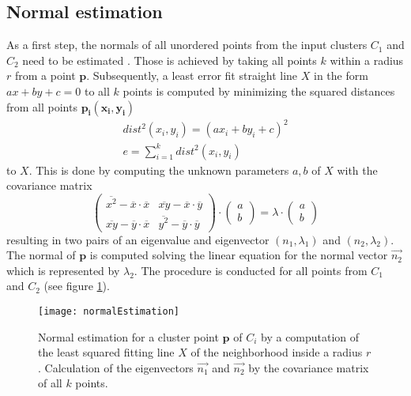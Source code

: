 \subsection{Normal estimation}
\label{normal}

As a first step, the normals of all unordered points from the input clusters $C_1$ and $C_2$ need to be estimated \cite{normals}. Those is achieved by taking all points $k$ within a radius $r$ from a point $\boldsymbol{p}$. Subsequently, a least error fit straight line $X$ in the form $ax + by +c = 0$ to all $k$ points is computed by minimizing the squared distances from all points $\boldsymbol{p_i(x_i,y_i)}$
\begin{equation}
\begin{split}
dist^2(x_i, y_i) = (ax_i + by_i + c)^2
\\
e =   \displaystyle\sum_{i=1}^{k} dist^2(x_i, y_i)
\end{split}
\end{equation}
to $X$. This is done by computing the unknown parameters $a, b$ of $X$ with the covariance matrix 
\begin{equation}
\begin{pmatrix}
\overline{x^2} - \overline{x} \cdot \overline{x} & \overline{xy} -\overline{x} \cdot \overline{y}\\
\overline{xy} -\overline{y} \cdot \overline{x} & \overline{y^2} -\overline{y} \cdot \overline{y}
\end{pmatrix} \cdot \begin{pmatrix}
a \\
b
\end{pmatrix} = \lambda \cdot \begin{pmatrix}
a \\
b
\end{pmatrix}
\end{equation}
resulting in two pairs of an eigenvalue and eigenvector $(n_1,\lambda_1)$ and $(n_2,\lambda_2)$. The normal of $\boldsymbol{p}$ is computed solving the linear equation for the normal vector $\vec{n_2}$ which is represented by $\lambda_2$. The procedure is conducted for all points from $C_1$ and $C_2$ (see figure \ref{fig:normalEstimation}). 
\begin{figure}[H]
	\centering
	\texttt{[image: normalEstimation]}
	\caption{Normal estimation for a cluster point $\boldsymbol{p}$ of $C_i$ by a computation of the least squared fitting line $X$ of the neighborhood inside a radius $r$. Calculation of the eigenvectors $\vec{n_1}$ and $\vec{n_2}$ by the covariance matrix of all $k$ points.}
	\label{fig:normalEstimation}
\end{figure}
